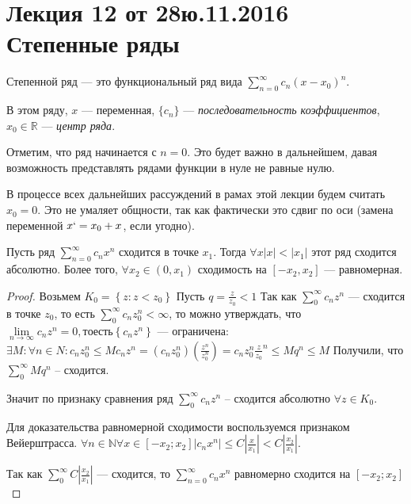 \documentclass[a4paper, 12pt]{article}
\begin{document}
\pagestyle{fancy}
\section{Лекция 12 от 28ю.11.2016 \\ Степенные ряды}
\begin{Def}
	Степенной ряд --- это функциональный ряд вида $\sum\limits_{n = 0}^{\infty}c_n (x-x_0)^n$.
\end{Def}
В этом ряду, $x$ --- переменная, $\{c_n\}$ --- \textit{последовательность коэффициентов}, $x_0 \in \mathbb{R}$ ---  \textit{центр ряда}.

Отметим, что ряд начинается с $n = 0$. Это будет важно в дальнейшем, давая возможность представлять рядами функции в нуле не равные нулю.


В процессе всех дальнейших рассуждений в рамах этой лекции будем считать $x_0 = 0$. Это не умаляет общности, так как фактически это сдвиг по оси (замена переменной $x` = x_0+x$, если угодно).



\begin{Theorem} [Абеля I]
	Пусть ряд $\sum\limits_{n = 0}^{\infty}c_n x^n$ сходится в точке $x_1$. Тогда $\forall x |x| < |x_1|$ этот ряд сходится абсолютно. Более того, $\forall x_2 \in (0, x_1)$ сходимость на $[-x_2, x_2]$ --- равномерная.
\end{Theorem}
\begin{proof}
	
	Возьмем $K_{0}=\left \{ z \right.: z <\left. z_{0} \right \}$
	Пусть $q= \frac{z}{z_{0}} <1$
	Так как $\sum\limits_{0}^{\infty}c_{n}z^{n}$ --- сходится в точке $z_{0}$, то есть  $\sum\limits_{0}^{\infty}c_{n}z_{0}^{n}<\infty$, то можно утверждать, что $\lim\limits_{n\rightarrow\infty}c_{n}z^{n}=0, то есть \left \{ c_{n}z^{n} \right \}$ --- ограничена: $\exists M:\forall n\in N:  c_{n}z_{0}^{n} \leq M
	  c_{n}z^{n} = \left ( c_{n}z_{0}^{n} \right )\left ( \frac{z^{n}}{z_{0}^{n}} \right ) =  c_{n}z_{0}^{n}  \frac{z}{z_{0}} ^{n}\leq M q^{n}\leq M$
	Получили, что $\sum\limits_{0}^{\infty}Mq^{n}$ – сходится.
	
	Значит по признаку сравнения ряд $\sum\limits_{0}^{\infty} c_{n}z^{n}$ – сходится абсолютно $\forall z\in K_{0}$.
	                       
	Для доказательства равномерной сходимости воспользуемся признаком Вейерштрасса.
	$\forall n \in \mathbb{N} \forall x \in [-x_2; x_2] |c_nx^n| \leq C\left|\frac{x}{x_1} \right| < C\left|\frac{x_2}{x_1} \right|  $.
	
	Так как   $\sum\limits_{0}^{\infty} C\left|\frac{x_2}{x_1} \right|$ --- сходится, то $\sum\limits_{n = 0}^{\infty}c_n x^n$ равномерно сходится на $[-x_2; x_2]$           \end{proof}
\end{document}

